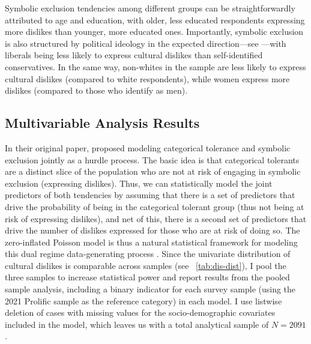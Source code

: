 \documentclass[12pt]{article}
\begin{document}
Symbolic exclusion tendencies among different groups can be straightforwardly attributed to age and education, with older, less educated respondents expressing more dislikes than younger, more educated ones. Importantly, symbolic exclusion is also structured by political ideology in the expected direction---see \citet{rawlings2023polarization-0af}---with liberals being less likely to express cultural dislikes than self-identified conservatives. In the same way, non-whites in the sample are less likely to express cultural dislikes (compared to white respondents), while women express more dislikes (compared to those who identify as men). 

\subsection*{Multivariable Analysis Results}
In their original paper, \citet{lizardo2016end-4fb} proposed modeling categorical tolerance and symbolic exclusion jointly as a hurdle process. The basic idea is that categorical tolerants are a distinct slice of the population who are not at risk of engaging in symbolic exclusion (expressing dislikes). Thus, we can statistically model the joint predictors of both tendencies by assuming that there is a set of predictors that drive the probability of being in the categorical tolerant group (thus not being at risk of expressing dislikes), and net of this, there is a second set of predictors that drive the number of dislikes expressed for those who are at risk of doing so. The zero-inflated Poisson model is thus a natural statistical framework for modeling this dual regime data-generating process \citep{zorn1998analytic-6b1}. Since the univariate distribution of cultural dislikes is comparable across samples (see ~\ref{tab:dis-dist}), I pool the three samples to increase statistical power and report results from the pooled sample analysis, including a binary indicator for each survey sample (using the 2021 Prolific sample as the reference category) in each model. I use listwise deletion of cases with missing values for the socio-demographic covariates included in the model, which leaves us with a total analytical sample of $N = 2091$.
\end{document}
